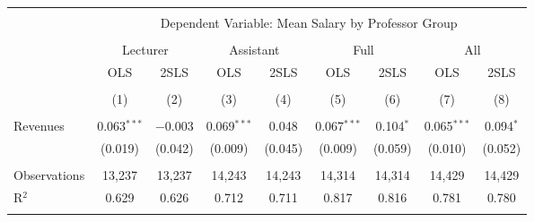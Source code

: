 
\begin{tabular}{@{\extracolsep{5pt}}lcccccccc} 
\\[-1.8ex]\hline 
\hline \\[-1.8ex] 
 & \multicolumn{8}{c}{Dependent Variable: Mean Salary by Professor Group} \\ 
\cline{2-9} 
\\[-1.8ex] & \multicolumn{2}{c}{Lecturer} & \multicolumn{2}{c}{Assistant} & \multicolumn{2}{c}{Full} & \multicolumn{2}{c}{All} \\ 
 & OLS & 2SLS & OLS & 2SLS & OLS & 2SLS & OLS & 2SLS \\ 
\\[-1.8ex] & (1) & (2) & (3) & (4) & (5) & (6) & (7) & (8)\\ 
\hline \\[-1.8ex] 
 Revenues & 0.063$^{***}$ & $-$0.003 & 0.069$^{***}$ & 0.048 & 0.067$^{***}$ & 0.104$^{*}$ & 0.065$^{***}$ & 0.094$^{*}$ \\ 
  & (0.019) & (0.042) & (0.009) & (0.045) & (0.009) & (0.059) & (0.010) & (0.052) \\ 
 \hline \\[-1.8ex] 
Observations & 13,237 & 13,237 & 14,243 & 14,243 & 14,314 & 14,314 & 14,429 & 14,429 \\ 
R$^{2}$ & 0.629 & 0.626 & 0.712 & 0.711 & 0.817 & 0.816 & 0.781 & 0.780 \\ 
\hline 
\hline \\[-1.8ex] 
\end{tabular} 
